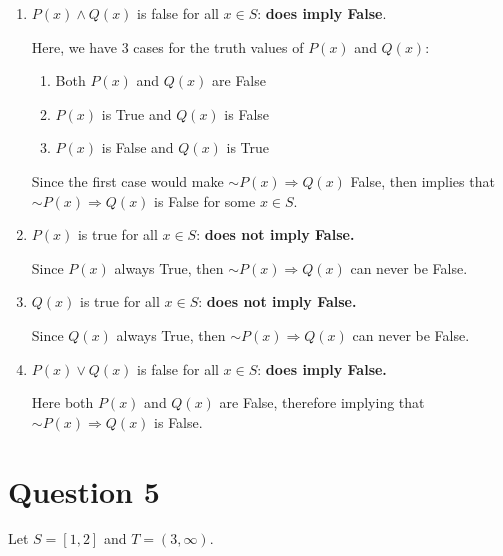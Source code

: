 \documentclass[11pt, oneside]{article}   	%
\begin{document}
\begin{enumerate}[ (a)]    

	\item $P(x) \land Q(x)$ is false for all $x \in S$: \textbf{does imply False}.
	
	Here, we have 3 cases for the truth values of $P(x)$ and $Q(x)$: 
	\begin{enumerate}[\qquad 1.]
		\item Both $P(x)$ and $Q(x)$ are False
		\item $P(x)$ is True and $Q(x)$ is False
		\item $P(x)$ is False and $Q(x)$ is True
	\end{enumerate}	
	
	Since the first case would make $\sim P(x) \Rightarrow Q(x)$ False, then   implies that $\sim P(x) \Rightarrow Q(x)$ is False for some $x \in S$.
	
	\item $P(x)$ is true for all $x \in S$: \textbf{does not imply False.}
	
	Since $P(x)$ always True, then $\sim P(x) \Rightarrow Q(x)$ can never be False.
	
	\item $Q(x)$ is true for all $x \in S$: \textbf{does not imply False.}
	
	Since $Q(x)$ always True, then $\sim P(x) \Rightarrow Q(x)$ can never be False.
	
	\item $P(x) \lor Q(x)$ is false for all $x \in S$: \textbf{does imply False.}
	
	Here both $P(x)$ and $Q(x)$ are False, therefore implying that $\sim P(x) \Rightarrow Q(x)$ is False.
\end{enumerate}


\section*{Question 5}

Let $S=[1,2]$ and $T=(3, \infty)$.
\end{document}
